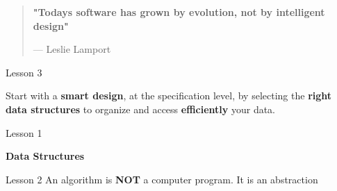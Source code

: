 \documentclass[aspectratio=1610]{beamer}
\begin{document}
\begin{frame}
\begin{center}
\Huge
\begin{quote}
\textbf{"Todays software has grown by evolution, not by intelligent design"}
\begin{flushright}
{--- Leslie Lamport}	
\end{flushright}
\end{quote}
\end{center}
\end{frame}



\begin{frame}{Lesson 3}{}
\LARGE
\begin{center}
   Start with a \textbf{smart design}, at the specification level, by selecting the \textbf{right data structures} to organize and access \textbf{efficiently} your data.
\end{center}
\end{frame}



\begin{frame}{Lesson 1}{}
\begin{center}
\Huge \textbf{Data Structures}
\end{center}
\end{frame}

\begin{frame}{Lesson 2}{}
\Huge
 An algorithm is \textbf{NOT} a computer program. It is an abstraction
 \end{frame}
\end{document}
